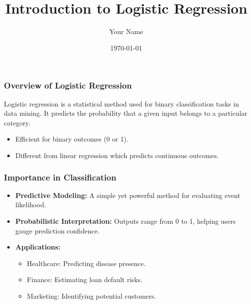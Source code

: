 \documentclass[aspectratio=169]{beamer}
\begin{document}
\frame{\titlepage}

\begin{frame}[fragile]
    \title{Introduction to Logistic Regression}
    \author{Your Name}
    \date{\today}
    \maketitle
\end{frame}

\begin{frame}[fragile]
    \frametitle{Overview of Logistic Regression}
    Logistic regression is a statistical method used for binary classification tasks in data mining. It predicts the probability that a given input belongs to a particular category.
    
    \begin{itemize}
        \item Efficient for binary outcomes (0 or 1).
        \item Different from linear regression which predicts continuous outcomes.
    \end{itemize}
\end{frame}

\begin{frame}[fragile]
    \frametitle{Importance in Classification}
    \begin{itemize}
        \item \textbf{Predictive Modeling:} A simple yet powerful method for evaluating event likelihood.
        \item \textbf{Probabilistic Interpretation:} Outputs range from 0 to 1, helping users gauge prediction confidence.
        \item \textbf{Applications:} 
        \begin{itemize}
            \item Healthcare: Predicting disease presence.
            \item Finance: Estimating loan default risks.
            \item Marketing: Identifying potential customers.
        \end{itemize}
    \end{itemize}
\end{frame}
\end{document}
